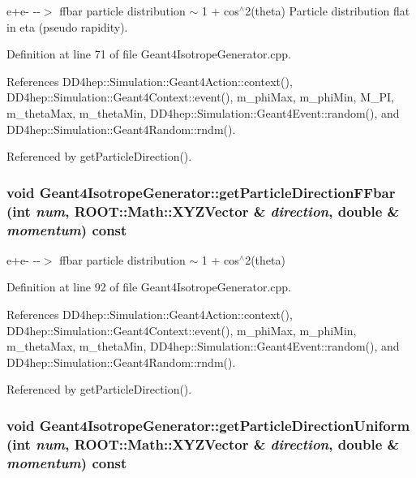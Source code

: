 e+e-\/ -\/-\/$>$ ffbar particle distribution $\sim$ 1 + cos$^\wedge$2(theta) Particle distribution flat in eta (pseudo rapidity). 

Definition at line 71 of file Geant4IsotropeGenerator.cpp.

References DD4hep::Simulation::Geant4Action::context(), DD4hep::Simulation::Geant4Context::event(), m\_\-phiMax, m\_\-phiMin, M\_\-PI, m\_\-thetaMax, m\_\-thetaMin, DD4hep::Simulation::Geant4Event::random(), and DD4hep::Simulation::Geant4Random::rndm().

Referenced by getParticleDirection().\hypertarget{class_d_d4hep_1_1_simulation_1_1_geant4_isotrope_generator_a40e412ab8c1a342416dfbf98762d6190}{
\subsubsection[{getParticleDirectionFFbar}]{\setlength{\rightskip}{0pt plus 5cm}void Geant4IsotropeGenerator::getParticleDirectionFFbar (int {\em num}, \/  ROOT::Math::XYZVector \& {\em direction}, \/  double \& {\em momentum}) const}}
\label{class_d_d4hep_1_1_simulation_1_1_geant4_isotrope_generator_a40e412ab8c1a342416dfbf98762d6190}


e+e-\/ -\/-\/$>$ ffbar particle distribution $\sim$ 1 + cos$^\wedge$2(theta) 

Definition at line 92 of file Geant4IsotropeGenerator.cpp.

References DD4hep::Simulation::Geant4Action::context(), DD4hep::Simulation::Geant4Context::event(), m\_\-phiMax, m\_\-phiMin, m\_\-thetaMax, m\_\-thetaMin, DD4hep::Simulation::Geant4Event::random(), and DD4hep::Simulation::Geant4Random::rndm().

Referenced by getParticleDirection().\hypertarget{class_d_d4hep_1_1_simulation_1_1_geant4_isotrope_generator_a77eadd30ad9d62796bcd5abab9e8e1d8}{
\subsubsection[{getParticleDirectionUniform}]{\setlength{\rightskip}{0pt plus 5cm}void Geant4IsotropeGenerator::getParticleDirectionUniform (int {\em num}, \/  ROOT::Math::XYZVector \& {\em direction}, \/  double \& {\em momentum}) const}}
\label{class_d_d4hep_1_1_simulation_1_1_geant4_isotrope_generator_a77eadd30ad9d62796bcd5abab9e8e1d8}


